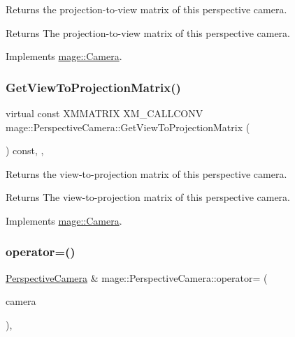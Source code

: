 Returns the projection-\/to-\/view matrix of this perspective camera.

\begin{DoxyReturn}{Returns}
The projection-\/to-\/view matrix of this perspective camera. 
\end{DoxyReturn}


Implements \hyperlink{classmage_1_1_camera_a9259dee9eeee754a1392cca88f428d29}{mage\+::\+Camera}.

\hypertarget{classmage_1_1_perspective_camera_a10348ff23fab164566ffb223a75bf745}{}\label{classmage_1_1_perspective_camera_a10348ff23fab164566ffb223a75bf745} 
\subsubsection{\texorpdfstring{Get\+View\+To\+Projection\+Matrix()}{GetViewToProjectionMatrix()}}
{\footnotesize\ttfamily virtual const X\+M\+M\+A\+T\+R\+IX X\+M\+\_\+\+C\+A\+L\+L\+C\+O\+NV mage\+::\+Perspective\+Camera\+::\+Get\+View\+To\+Projection\+Matrix (\begin{DoxyParamCaption}{ }\end{DoxyParamCaption}) const\hspace{0.3cm}{\ttfamily [override]}, {\ttfamily [virtual]}, {\ttfamily [noexcept]}}

Returns the view-\/to-\/projection matrix of this perspective camera.

\begin{DoxyReturn}{Returns}
The view-\/to-\/projection matrix of this perspective camera. 
\end{DoxyReturn}


Implements \hyperlink{classmage_1_1_camera_a716d842481321b8b4d71da45ab77a7c9}{mage\+::\+Camera}.

\hypertarget{classmage_1_1_perspective_camera_aeb226c7027f96fb225135987010cc781}{}\label{classmage_1_1_perspective_camera_aeb226c7027f96fb225135987010cc781} 
\subsubsection{\texorpdfstring{operator=()}{operator=()}\hspace{0.1cm}{\footnotesize\ttfamily [1/2]}}
{\footnotesize\ttfamily \hyperlink{classmage_1_1_perspective_camera}{Perspective\+Camera} \& mage\+::\+Perspective\+Camera\+::operator= (\begin{DoxyParamCaption}\item[{const \hyperlink{classmage_1_1_perspective_camera}{Perspective\+Camera} \&}]{camera }\end{DoxyParamCaption})\hspace{0.3cm}{\ttfamily [default]}, {\ttfamily [noexcept]}}

